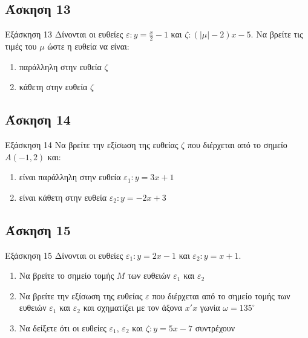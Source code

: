 \documentclass[greek]{beamer}
\begin{document}
\subsection{Άσκηση 13}
\begin{frame}[label=Άσκηση13]{Εξάσκηση 13}
 Δίνονται οι ευθείες $ε:y=\frac{x}{2}-1$ και $ζ:(|μ|-2)x-5$. Να βρείτε τις τιμές του $μ$ ώστε η ευθεία να είναι:
 \begin{enumerate}
  \item<1-> παράλληλη στην ευθεία $ζ$
  \item<2-> κάθετη στην ευθεία $ζ$
 \end{enumerate}

\end{frame}

\subsection{Άσκηση 14}
\begin{frame}[label=Άσκηση14]{Εξάσκηση 14}
 Να βρείτε την εξίσωση της ευθείας $ζ$ που διέρχεται από το σημείο $Α(-1,2)$ και:
 \begin{enumerate}
  \item<1-> είναι παράλληλη στην ευθεία $ε_1:y=3x+1$
  \item<2-> είναι κάθετη στην ευθεία $ε_2:y=-2x+3$
 \end{enumerate}

\end{frame}

\subsection{Άσκηση 15}
\begin{frame}[label=Άσκηση15]{Εξάσκηση 15}
 Δίνονται οι ευθείες $ε_1:y=2x-1$ και $ε_2:y=x+1$.
 \begin{enumerate}
  \item<1-> Να βρείτε το σημείο τομής $Μ$ των ευθειών $ε_1$ και $ε_2$
  \item<2-> Να βρείτε την εξίσωση της ευθείας $ε$ που διέρχεται από το σημείο τομής των ευθειών $ε_1$ και $ε_2$ και σχηματίζει με τον άξονα $x'x$ γωνία $ω=135^{\circ}$
  \item<3-> Να δείξετε ότι οι ευθείες $ε_1$, $ε_2$ και $ζ:y=5x-7$ συντρέχουν
 \end{enumerate}

\end{frame}
\end{document}
